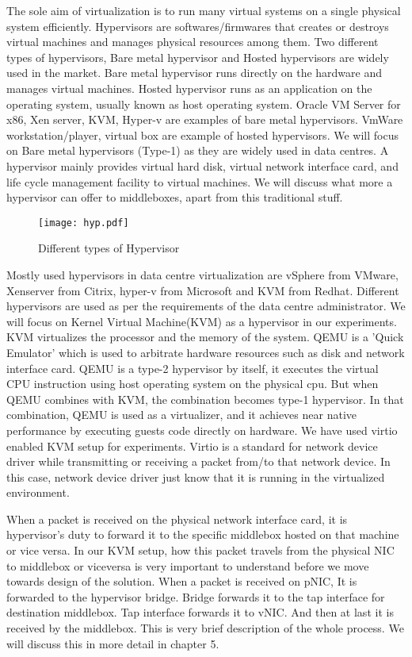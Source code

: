 \documentclass[a4paper,11pt]{report}
\begin{document}
The sole aim of virtualization is to run many virtual systems on a single physical system efficiently. Hypervisors are softwares/firmwares that creates or destroys virtual machines and manages physical resources among them. Two different types of hypervisors, Bare metal hypervisor and Hosted hypervisors are widely used in the market. Bare metal hypervisor runs directly on the hardware and manages virtual machines. Hosted hypervisor runs as an application on the operating system, usually known as host operating system. Oracle VM Server for x86, Xen server, KVM, Hyper-v are examples of bare metal hypervisors. VmWare workstation/player, virtual box are example of hosted hypervisors. We will focus on Bare metal hypervisors (Type-1) as they are widely used in data centres. A hypervisor mainly provides virtual hard disk, virtual network interface card, and life cycle management facility to virtual machines. We will discuss what more a hypervisor can offer to middleboxes, apart from this traditional stuff. 
\begin{figure}[h]
\centering
\texttt{[image: hyp.pdf]}
\caption{Different types of Hypervisor}
\end{figure}  
Mostly used hypervisors in data centre virtualization are vSphere from VMware, Xenserver from Citrix, hyper-v from Microsoft and KVM from Redhat. Different hypervisors are used as per the requirements of the data centre administrator. We will focus on Kernel Virtual Machine(KVM) as a hypervisor in our experiments. KVM virtualizes the processor and the memory of the system. QEMU is a 'Quick Emulator' which is used to arbitrate hardware resources such as disk and network interface card. QEMU is a type-2 hypervisor by itself, it executes the virtual CPU instruction using host operating system on the physical cpu. But when QEMU combines with KVM, the combination becomes type-1 hypervisor. In that combination, QEMU is used as a virtualizer, and it achieves near native performance by executing guests code directly on hardware. We have used virtio enabled KVM setup for experiments. Virtio is a standard for network device driver while transmitting or receiving a packet from/to that network device. In this case, network device driver just know that it is running in the virtualized environment.

When a packet is received on the physical network interface card, it is hypervisor's duty to forward it to the specific middlebox hosted on that machine or vice versa. In our KVM setup, how this packet travels from the physical NIC to middlebox or viceversa is very important to understand before we move towards design of the solution. When a packet is received on pNIC, It is forwarded to the hypervisor bridge. Bridge forwards it to the tap interface for destination middlebox. Tap interface forwards it to vNIC. And then at last it is received by the middlebox. This is very brief description of the whole process. We will discuss this in more detail in chapter 5.
\end{document}
